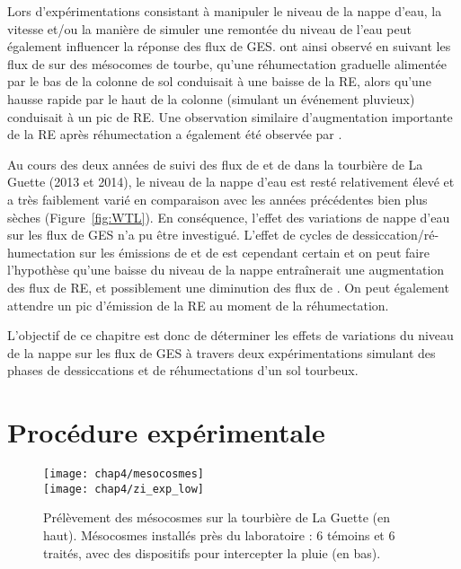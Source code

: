Lors d'expérimentations consistant à manipuler le niveau de la nappe d'eau, la vitesse et/ou la manière de simuler une remontée du niveau de l'eau peut également influencer la réponse des flux de GES.
\citet{strack2009} ont ainsi observé en suivant les flux de \coo sur des mésocomes de tourbe, qu'une réhumectation graduelle alimentée par le bas de la colonne de sol conduisait à une baisse de la RE, alors qu'une hausse rapide par le haut de la colonne (simulant un événement pluvieux) conduisait à un pic de RE.
Une observation similaire d'augmentation importante de la RE après réhumectation a également été observée par  \citet{mcneil2003}.


Au cours des deux années de suivi des flux de \coo et de \chh dans la tourbière de La Guette (2013 et 2014), le niveau de la nappe d'eau est resté relativement élevé et a très faiblement varié en comparaison avec les années précédentes bien plus sèches (Figure~\ref{fig:WTL}).
En conséquence, l'effet des variations de nappe d'eau sur les flux de GES n'a pu être investigué.
L'effet de cycles de dessiccation/ré-humectation sur les émissions de \coo et de \chh est cependant certain et on peut faire l'hypothèse qu'une baisse du niveau de la nappe entraînerait une augmentation des flux de RE, et possiblement une diminution des flux de \chh.
On peut également attendre un pic d'émission de la RE au moment de la réhumectation.

L'objectif de ce chapitre est donc de déterminer les effets de variations du niveau de la nappe sur les flux de GES à travers deux expérimentations simulant des phases de dessiccations et de réhumectations d'un sol tourbeux.

\section{Procédure expérimentale}

\begin{figure}
\centering
\texttt{[image: chap4/mesocosmes]}\\
\texttt{[image: chap4/zi\_exp\_low]}
\caption{Prélèvement des mésocosmes sur la tourbière de La Guette (en haut). Mésocosmes installés près du laboratoire : 6 témoins et 6 traités, avec des dispositifs pour intercepter la pluie (en bas).}
\label{fig:mesophoto}
\end{figure}


